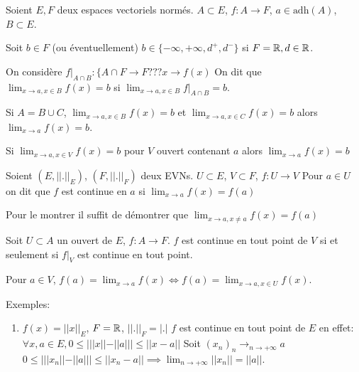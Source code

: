 \documentclass[a4paper, 12pt]{article}
\begin{document}
\begin{definition}
    Soient $E, F$ deux espaces vectoriels normés.
    $A \subset E$, $f: A \rightarrow F$, $a \in \text{adh}(A)$, $B \subset E$.

    Soit $b \in F$ (ou éventuellement) $b \in \{-\infty, +\infty, d^+, d^-\}$ si $F = \mathbb{R}, d \in \mathbb{R}$.

    On considère $f|_{A \cap B}: \{ A \cap F \rightarrow F \text{???} x \to f(x)$
    On dit que $\lim_{x \to a, x \in B}f(x) = b$ si $\lim_{x \to a, x \in B}f|_{A \cap B} = b$.
\end{definition}

\begin{remarque}
    Si $A = B \cup C$, $\lim_{x \to a, x \in B}f(x)= b$ et $\lim_{x \to a, x \in C}f(x) = b$
    alors $\lim_{x \to a}f(x) = b$.

    Si $\lim_{x \to a, x \in V}f(x) = b$ pour $V$ ouvert contenant $a$ alors $\lim_{x \to a}f(x) = b$
\end{remarque}

\begin{definition}
    Soient $(E, ||.||_E)$, $(F, ||.||_F)$ deux EVNs.
    $U \subset E$, $V \subset F$, $f:U \rightarrow V$
    Pour $a \in U$ on dit que $f$ est continue en $a$ si $\lim_{x \to a}f(x) = f(a)$ 
\end{definition}

\begin{remarque}
    Pour le montrer il suffit de démontrer que $\lim_{x \to a, x \neq a}f(x) = f(a)$
\end{remarque}

Soit $U \subset A$ un ouvert de $E$, $f: A \rightarrow F$. $f$ est continue en tout point de $V$ si et seulement si
$f|_V$ est continue en tout point.

\begin{demonstration}
    Pour $a \in V$, $f(a) = \lim_{x \to a}f(x) \iff f(a)=\lim_{x \to a, x \in U}f(x)$.
\end{demonstration}

Exemples:

\begin{enumerate}
    \item $f(x) = ||x||_E$, $F = \mathbb{R}$, $||.||_F = |.|$
    $f$ est continue en tout point de $E$
    en effet: $\forall x, a \in E, 0 \leq |||x|| - ||a||| \leq ||x - a||$ Soit $(x_n)_n \rightarrow_{n \to +\infty} a$
    $0 \leq |||x_n|| - ||a||| \leq ||x_n - a|| \implies \lim_{n \to +\infty}||x_n|| = ||a||$.
\end{enumerate}
\end{document}
